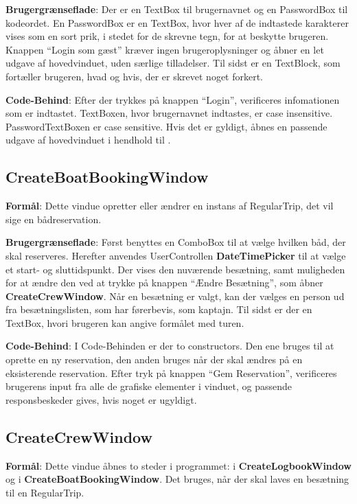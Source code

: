 \textbf{Brugergrænseflade}:
Der er en TextBox til brugernavnet og en PasswordBox til kodeordet.
En PasswordBox er en TextBox, hvor hver af de indtastede karakterer vises som en sort prik, i stedet for de skrevne tegn, for at beskytte brugeren.
Knappen ``Login som gæst'' kræver ingen brugeroplysninger og åbner en let udgave af hovedvinduet, uden særlige tilladelser.
Til sidst er en TextBlock, som fortæller brugeren, hvad og hvis, der er skrevet noget forkert.

\textbf{Code-Behind}: 
Efter der trykkes på knappen ``Login'', verificeres infomationen som er indtastet.
TextBoxen, hvor brugernavnet indtastes, er case insensitive.
PasswordTextBoxen er case sensitive.
Hvis det er gyldigt, åbnes en passende udgave af hovedvinduet i hendhold til .

\subsection{CreateBoatBookingWindow}
\textbf{Formål}: 
Dette vindue opretter eller ændrer en instans af RegularTrip, det vil sige en bådreservation. 

\textbf{Brugergrænseflade}: 
Først benyttes en ComboBox til at vælge hvilken båd, der skal reserveres.
Herefter anvendes UserControllen \textbf{DateTimePicker} til at vælge et start- og sluttidspunkt.
Der vises den nuværende besætning, samt muligheden for at ændre den ved at trykke på knappen ``Ændre Besætning'', som åbner \textbf{CreateCrewWindow}.
Når en besætning er valgt, kan der vælges en person ud fra besætningslisten, som har førerbevis, som kaptajn.
Til sidst er der en TextBox, hvori brugeren kan angive formålet med turen.

\textbf{Code-Behind}: 
I Code-Behinden er der to constructors. 
Den ene bruges til at oprette en ny reservation, den anden bruges når der skal ændres på en eksisterende reservation. 
Efter tryk på knappen ``Gem Reservation'', verificeres brugerens input fra alle de grafiske elementer i vinduet, og passende responsbeskeder gives, hvis noget er ugyldigt.

\subsection{CreateCrewWindow}

\textbf{Formål}: Dette vindue åbnes to steder i programmet: i \textbf{CreateLogbookWindow} og i \textbf{CreateBoatBookingWindow}. 
Det bruges, når der skal laves en besætning til en RegularTrip.  

